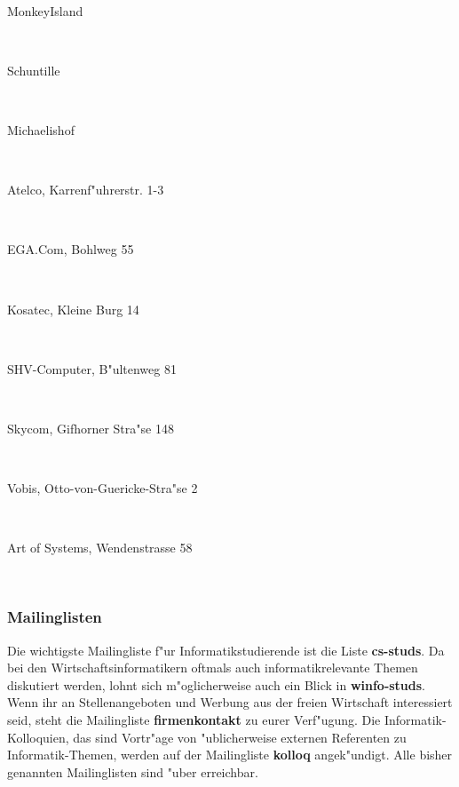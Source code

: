 \begin{description}
   \\
 \item[MonkeyIsland]~\\\small{}
 \item[Schuntille]~\\
 \item[Michaelishof]~\\
 \item[Atelco, Karrenf"uhrerstr. 1-3]~\\
 \item[EGA.Com, Bohlweg 55]~\\
 \item[Kosatec, Kleine Burg 14]~\\
 \item[SHV-Computer, B"ultenweg 81]~\\
 \item[Skycom, Gifhorner Stra"se 148]~\\
 \item[Vobis, Otto-von-Guericke-Stra"se 2]~\\
 \item[Art of Systems, Wendenstrasse 58]~\\
 \end{description}

\subsubsection*{Mailinglisten}

Die wichtigste Mailingliste f"ur Informatikstudierende ist die Liste
\textbf{cs-studs}. Da bei den Wirtschaftsinformatikern oftmals auch
informatikrelevante Themen diskutiert werden, lohnt sich m"oglicherweise auch
ein Blick in \textbf{winfo-studs}. Wenn ihr an Stellenangeboten und Werbung aus
der freien Wirtschaft interessiert seid, steht die Mailingliste
\textbf{firmenkontakt} zu eurer Verf"ugung. Die Informatik-Kolloquien, das sind
Vortr"age von "ublicherweise externen Referenten zu Informatik-Themen, werden
auf der Mailingliste \textbf{kolloq} angek"undigt. Alle bisher genannten
Mailinglisten sind "uber 
erreichbar.

